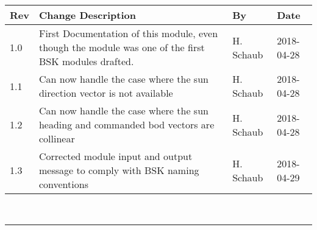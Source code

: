 \documentclass[]{BasiliskReportMemo}
\begin{document}
\makeCover

%
%
\newpage
\pagestyle{empty}
{\renewcommand{\arraystretch}{2}
\noindent
\begin{longtable}{|p{0.5in}|p{3.5in}|p{1.07in}|p{0.9in}|}
\hline
{\bfseries Rev} & {\bfseries Change Description} & {\bfseries By}& {\bfseries Date} \\
\hline
1.0 & First Documentation of this module, even though the module was one of the first BSK modules drafted. & H. Schaub & 2018-04-28\\
1.1 & Can now handle the case where the sun direction vector is not available & H. Schaub & 2018-04-28 \\
1.2 & Can now handle the case where the sun heading and commanded bod vectors are collinear & H. Schaub & 2018-04-28 \\
1.3 & Corrected module input and output message to comply with BSK naming conventions & H. Schaub & 2018-04-29 \\
\hline

\end{longtable}
}



\newpage
\setcounter{page}{1}
\pagestyle{fancy}

\tableofcontents %
~\\ \hrule ~\\ %










	









\end{document}
